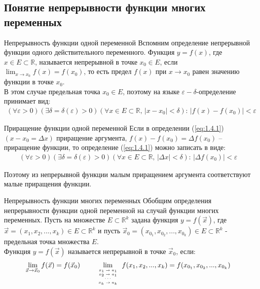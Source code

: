 \subsection{Понятие непрерывности функции многих переменных}

\begin{tbox}{Непрерывность функции одной переменной}
	Вспомним определение непрерывной функции одного действительного переменного. Функция \(y = f(x)\), где \(x \in E \subset \mathbb{R}\), называется непрерывной в точке \(x_0 \in E\), если $\lim_{x \to x_0} f(x) = f(x_0)$, то есть предел \(f(x)\) при \(x \to x_0\) равен значению функции в точке \(x_0\). \\

	В этом случае предельная точка \(x_0 \in E\), поэтому на языке \(\varepsilon - \delta\)-определение принимает вид:
	\begin{align} \label{eq:1.4.1}
		(\forall \varepsilon > 0)(\exists \delta = \delta(\varepsilon) > 0)(\forall x \in E \subset \mathbb{R}, \, |x - x_0| < \delta): \, |f(x) - f(x_0)| < \varepsilon
	\end{align}
\end{tbox}

\begin{tbox}{Приращение функции одной переменной}
	Если в определении (\ref{eq:1.4.1}) \((x - x_0 = \Delta x)\) приращение аргумента, $f(x) - f(x_0) = \Delta f(x_0)$ -- приращение функции, то определение (\ref{eq:1.4.1}) можно записать в виде:
	\begin{align} \label{eq:1.4.2}
		(\forall \varepsilon > 0)(\exists \delta = \delta(\varepsilon) > 0)(\forall x \in E \subset \mathbb{R}, \, |\Delta x| < \delta): \, |\Delta f(x_0)| < \varepsilon
	\end{align}

	Поэтому из непрерывной функции малым приращением аргумента соответствуют малые приращения функции.
\end{tbox}

\begin{tbox}{Непрерывность функции многих переменных}
	Обобщим определения непрерывности функции одной переменной на случай функции многих переменных. Пусть на множестве \(E \subset \mathbb{R}^k\) задана функция \(y=f(\vec{x})\), где $\vec{x} = (x_1, x_2, ..., x_k) \in E \subset \mathbb{R}^k$ и пусть $\vec{x}_0 = (x_\text{$0_1$}, x_\text{$0_2$}, ..., x_\text{$0_k$}) \in E \subset \mathbb{R}^k$ - предельная точка множества $E$.\\

	Функция $y = f(\vec{x})$ называется непрерывной в точке $\vec{x}_0$, если:
	\begin{align} \label{eq:1.4.3}
		\lim_{\vec{x} \to \vec{x}_0} f(\vec{x}) = f(\vec{x}_0) \qquad \lim_{\tiny{\begin{array}[b]{c}x_1 \to a_1\\x_2 \to a_1\\ \cdots \\ x_k \to a_k\end{array}}} f(x_1, x_2, ..., x_k) = f(x_\text{$0_1$}, x_\text{$0_2$}, ..., x_\text{$0_k$})
	\end{align}
\end{tbox}

